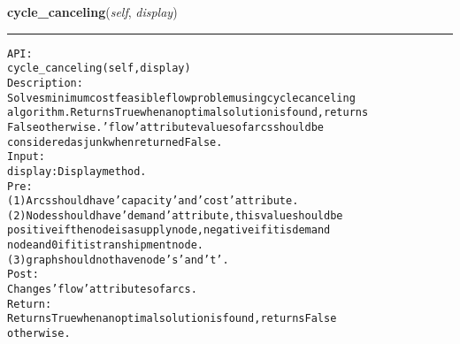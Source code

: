 \hspace{.8\funcindent}\begin{boxedminipage}{\funcwidth}

    \raggedright \textbf{cycle\_canceling}(\textit{self}, \textit{display})

    \vspace{-1.5ex}

    \rule{\textwidth}{0.5\fboxrule}
\setlength{\parskip}{2ex}
\begin{alltt}

API:
    cycle\_canceling(self, display)
Description:
    Solves minimum cost feasible flow problem using cycle canceling
    algorithm. Returns True when an optimal solution is found, returns
    False otherwise. 'flow' attribute values of arcs should be
    considered as junk when returned False.
Input:
    display: Display method.
Pre:
    (1) Arcs should have 'capacity' and 'cost' attribute.
    (2) Nodes should have 'demand' attribute, this value should be
    positive if the node is a supply node, negative if it is demand
    node and 0 if it is transhipment node.
    (3) graph should not have node 's' and 't'.
Post:
    Changes 'flow' attributes of arcs.
Return:
    Returns True when an optimal solution is found, returns False
    otherwise.
\end{alltt}

\setlength{\parskip}{1ex}
    \end{boxedminipage}

    \label{coinor:gimpy:graph:Graph:find_feasible_flow}

    \vspace{0.5ex}

